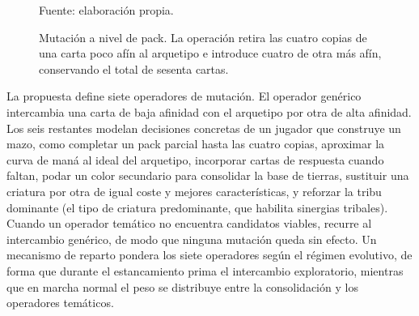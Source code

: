 \begin{figure}[H]
\centering
{}
\caption{Mutación a nivel de pack. La operación retira las cuatro copias de una carta poco afín al arquetipo e introduce cuatro de otra más afín, conservando el total de sesenta cartas.}
\label{fig:mutacion}
\vspace{2pt}
{\footnotesize Fuente: elaboración propia.}
\end{figure}

La propuesta define siete operadores de mutación. El operador genérico intercambia una carta de baja afinidad con el arquetipo por otra de alta afinidad. Los seis restantes modelan decisiones concretas de un jugador que construye un mazo, como completar un pack parcial hasta las cuatro copias, aproximar la curva de maná al ideal del arquetipo, incorporar cartas de respuesta cuando faltan, podar un color secundario para consolidar la base de tierras, sustituir una criatura por otra de igual coste y mejores características, y reforzar la tribu dominante (el tipo de criatura predominante, que habilita sinergias tribales). Cuando un operador temático no encuentra candidatos viables, recurre al intercambio genérico, de modo que ninguna mutación queda sin efecto. Un mecanismo de reparto pondera los siete operadores según el régimen evolutivo, de forma que durante el estancamiento prima el intercambio exploratorio, mientras que en marcha normal el peso se distribuye entre la consolidación y los operadores temáticos.

